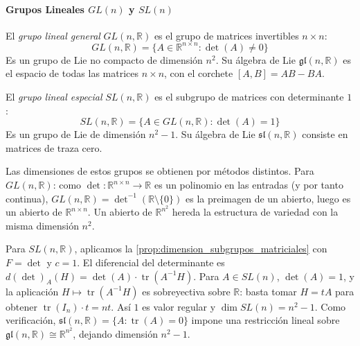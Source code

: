 \paragraph{Grupos Lineales $GL(n)$ y $SL(n)$}

\begin{definition}\label{def:grupo_gl_n}
El \textit{grupo lineal general} $GL(n, \mathbb{R})$ es el grupo de matrices invertibles $n \times n$:
\begin{equation}
GL(n, \mathbb{R}) = \{A \in \mathbb{R}^{n \times n} : \det(A) \neq 0\}
\end{equation}
Es un grupo de Lie no compacto de dimensión $n^2$. Su álgebra de Lie $\mathfrak{gl}(n, \mathbb{R})$ es el espacio de todas las matrices $n \times n$, con el corchete $[A, B] = AB - BA$.
\end{definition}

\begin{definition}\label{def:grupo_sl_n}
El \textit{grupo lineal especial} $SL(n, \mathbb{R})$ es el subgrupo de matrices con determinante $1$:
\begin{equation}
SL(n, \mathbb{R}) = \{A \in GL(n, \mathbb{R}) : \det(A) = 1\}
\end{equation}
Es un grupo de Lie de dimensión $n^2 - 1$. Su álgebra de Lie $\mathfrak{sl}(n, \mathbb{R})$ consiste en matrices de traza cero.
\end{definition}

Las dimensiones de estos grupos se obtienen por métodos distintos. Para $GL(n, \mathbb{R})$: como $\det: \mathbb{R}^{n \times n} \to \mathbb{R}$ es un polinomio en las entradas (y por tanto continua), $GL(n, \mathbb{R}) = \det^{-1}(\mathbb{R} \setminus \{0\})$ es la preimagen de un abierto, luego es un abierto de $\mathbb{R}^{n \times n}$. Un abierto de $\mathbb{R}^{n^2}$ hereda la estructura de variedad con la misma dimensión $n^2$.

Para $SL(n, \mathbb{R})$, aplicamos la \autoref{prop:dimension_subgrupos_matriciales} con $F = \det$ y $c = 1$. El diferencial del determinante es $d(\det)_A(H) = \det(A) \cdot \operatorname{tr}(A^{-1}H)$. Para $A \in SL(n)$, $\det(A) = 1$, y la aplicación $H \mapsto \operatorname{tr}(A^{-1}H)$ es sobreyectiva sobre $\mathbb{R}$: basta tomar $H = tA$ para obtener $\operatorname{tr}(I_n) \cdot t = nt$. Así $1$ es valor regular y $\dim SL(n) = n^2 - 1$. Como verificación, $\mathfrak{sl}(n, \mathbb{R}) = \{A : \operatorname{tr}(A) = 0\}$ impone una restricción lineal sobre $\mathfrak{gl}(n, \mathbb{R}) \cong \mathbb{R}^{n^2}$, dejando dimensión $n^2 - 1$.

